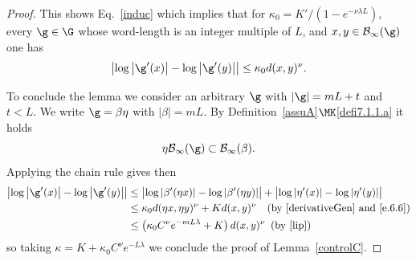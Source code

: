 \begin{proof}
This shows Eq.~\eqref{induc} which implies that for $\kappa_0=K'/(1-e^{-\nu\lambda L})$, every $\g\in\G$ whose word-length is an integer multiple of $L$, and $x,y\in\cal B_\infty(\g)$ one has
\[
\bigl\lvert\log\left|\g'(x)\right|-\log\left|\g'(y)\right|\bigr|\leq \kappa_0 d(x,y)^\nu.
\]


To conclude the lemma we consider an arbitrary $\g$ with $|\g|=mL+t$ and $t< L$. We write $\g=\beta \eta$ with $|\beta|=mL$. By Definition~\ref{assuA}$\MK$\eqref{defi7.1.1.a} it holds
\begin{equation}\label{e.6.6}
\eta \cal B_\infty(\g)\subset\cal B_\infty(\beta).
\end{equation}
Applying the chain rule gives then
\begin{align*}
\bigl\lvert\log\left|\g'(x)\right|-\log\left|\g'(y)\right|\bigr|& \leq \bigl\lvert\log\left|\beta'(\eta x)\right|-\log\left|\beta'(\eta y)\right|\bigr| +\bigl\lvert\log\left|\eta'(x)\right| -\log\left|\eta'(y)\right|\bigr|\\
& \leq \kappa_0d(\eta x,\eta y)^\nu + Kd(x,y)^\nu \quad (\text{by~\eqref{derivativeGen} and~\eqref{e.6.6}})\\
& \leq \left(\kappa_0C^\nu e^{-mL\lambda}+K\right) d(x,y)^\nu \;\:(\text{by~\eqref{lip}})
\end{align*}
so taking $\kappa=K+\kappa_0C^\nu e^{-L\lambda}$ we conclude the proof of Lemma~\ref{controlC}.
\end{proof}


